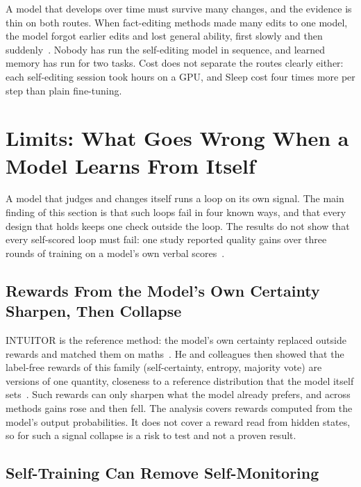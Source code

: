 \documentclass[journal]{IEEEtran}
\begin{document}
A model that develops over time must survive many changes, and the evidence is thin on both routes. When fact-editing methods made many edits to one model, the model forgot earlier edits and lost general ability, first slowly and then suddenly~\cite{Gupta2024}. Nobody has run the self-editing model in sequence, and learned memory has run for two tasks. Cost does not separate the routes clearly either: each self-editing session took hours on a GPU, and Sleep cost four times more per step than plain fine-tuning.

\section{Limits: What Goes Wrong When a Model Learns From Itself}\label{sec:7}

A model that judges and changes itself runs a loop on its own signal. The main finding of this section is that such loops fail in four known ways, and that every design that holds keeps one check outside the loop. The results do not show that every self-scored loop must fail: one study reported quality gains over three rounds of training on a model's own verbal scores~\cite{Yuan2024}.

\subsection{Rewards From the Model's Own Certainty Sharpen, Then Collapse}\label{sec:7.1}

INTUITOR is the reference method: the model's own certainty replaced outside rewards and matched them on maths~\cite{Zhao2025}. He and colleagues then showed that the label-free rewards of this family (self-certainty, entropy, majority vote) are versions of one quantity, closeness to a reference distribution that the model itself sets~\cite{He2026}. Such rewards can only sharpen what the model already prefers, and across methods gains rose and then fell. The analysis covers rewards computed from the model's output probabilities. It does not cover a reward read from hidden states, so for such a signal collapse is a risk to test and not a proven result.

\subsection{Self-Training Can Remove Self-Monitoring}\label{sec:7.2}
\end{document}
